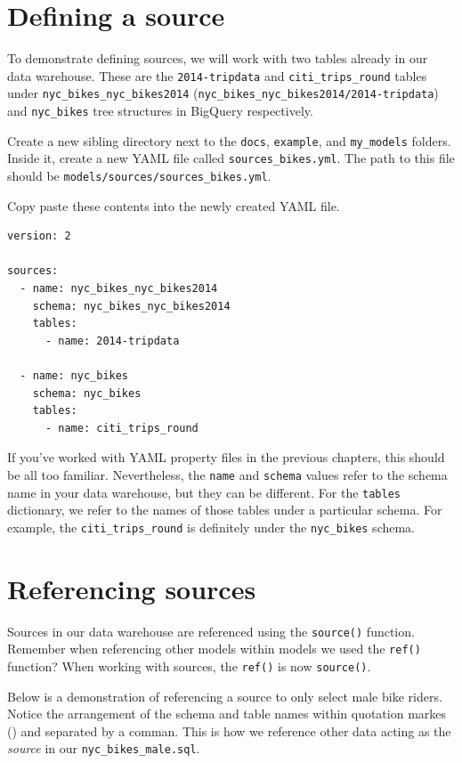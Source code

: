 \documentclass[
]{book}
\begin{document}
\hypertarget{defining-a-source}{%
\section{Defining a source}\label{defining-a-source}}

To demonstrate defining sources, we will work with two tables already in our data warehouse. These are the \texttt{2014-tripdata} and \texttt{citi\_trips\_round} tables under \texttt{nyc\_bikes\_nyc\_bikes2014} (\texttt{nyc\_bikes\_nyc\_bikes2014/2014-tripdata}) and \texttt{nyc\_bikes} tree structures in BigQuery respectively.

Create a new sibling directory next to the \texttt{docs}, \texttt{example}, and \texttt{my\_models} folders. Inside it, create a new YAML file called \texttt{sources\_bikes.yml}. The path to this file should be \texttt{models/sources/sources\_bikes.yml}.

Copy paste these contents into the newly created YAML file.

\begin{verbatim}
version: 2

sources:
  - name: nyc_bikes_nyc_bikes2014
    schema: nyc_bikes_nyc_bikes2014
    tables:
      - name: 2014-tripdata

  - name: nyc_bikes
    schema: nyc_bikes 
    tables:
      - name: citi_trips_round
\end{verbatim}

If you've worked with YAML property files in the previous chapters, this should be all too familiar. Nevertheless, the \texttt{name} and \texttt{schema} values refer to the schema name in your data warehouse, but they can be different. For the \texttt{tables} dictionary, we refer to the names of those tables under a particular schema. For example, the \texttt{citi\_trips\_round} is definitely under the \texttt{nyc\_bikes} schema.

\hypertarget{referencing-sources}{%
\section{Referencing sources}\label{referencing-sources}}

Sources in our data warehouse are referenced using the \texttt{source()} function. Remember when referencing other models within models we used the \texttt{ref()} function? When working with sources, the \texttt{ref()} is now \texttt{source()}.

Below is a demonstration of referencing a source to only select male bike riders. Notice the arrangement of the schema and table names within quotation markes (\texttt{\textquotesingle{}\textquotesingle{}}) and separated by a comman. This is how we reference other data acting as the \emph{source} in our \texttt{nyc\_bikes\_male.sql}.
\end{document}
